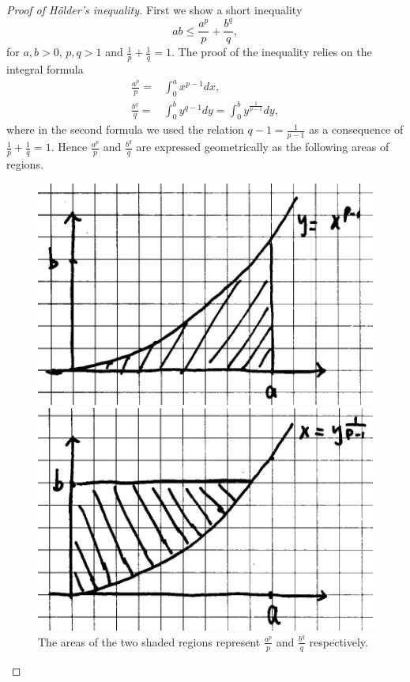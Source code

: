 \documentclass[a4paper,12pt]{article}
\newcommand{\Holder}{H\"{o}lder}
\theoremstyle{definition}
\theoremstyle{remark}
\begin{document}
\begin{proof}[Proof of \Holder's inequality]
  First we show a short inequality
  \begin{equation} \label{eq:short_ineq_for_Holder}
    ab \leq \frac{a^p}{p} + \frac{b^q}{q},
  \end{equation}
  for $a, b > 0$, $p, q > 1$ and $\frac{1}{p} + \frac{1}{q} = 1$. The proof of the inequality relies on the integral formula
  \begin{align*}
    \frac{a^p}{p} = {}& \int^a_0 x^{p-1} dx, \\
    \frac{b^q}{q} = {}& \int^b_0 y^{q-1} dy = \int^b_0 y^{\frac{1}{p-1}} dy,
  \end{align*}
  where in the second formula we used the relation $q-1 = \frac{1}{p-1}$ as a consequence of $\frac{1}{p} + \frac{1}{q} = 1$. Hence $\frac{a^p}{p}$ and $\frac{b^q}{q}$ are expressed geometrically as the following areas of regions.
  \begin{figure}[h]
    \centering
    \begin{minipage}{0.49\linewidth}
      \includegraphics{a_to_p}
    \end{minipage}
    \begin{minipage}{0.49\linewidth}
      \includegraphics{b_to_q}
    \end{minipage}
    \caption{The areas of the two shaded regions represent $\frac{a^p}{p}$ and $\frac{b^q}{q}$ respectively.}
  \end{figure}


\end{proof}
\end{document}
